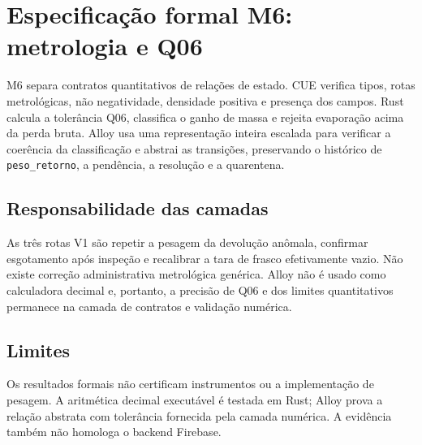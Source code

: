 \clearpage
\section{Especificação formal M6: metrologia e Q06}
\label{sec:formal-m6}

M6 separa contratos quantitativos de relações de estado. CUE verifica tipos,
rotas metrológicas, não negatividade, densidade positiva e presença dos campos.
Rust calcula a tolerância Q06, classifica o ganho de massa e rejeita evaporação
acima da perda bruta. Alloy usa uma representação inteira escalada para verificar
a coerência da classificação e abstrai as transições, preservando o histórico de
\texttt{peso\_retorno}, a pendência, a resolução e a quarentena.

\subsection*{Responsabilidade das camadas}
As três rotas V1 são repetir a pesagem da devolução anômala, confirmar
esgotamento após inspeção e recalibrar a tara de frasco efetivamente vazio.
Não existe correção administrativa metrológica genérica. Alloy não é usado como
calculadora decimal e, portanto, a precisão de Q06 e dos limites quantitativos
permanece na camada de contratos e validação numérica.

\begingroup\small\raggedright


\par\endgroup

\subsection*{Limites}
Os resultados formais não certificam instrumentos ou a implementação de pesagem.
A aritmética decimal executável é testada em Rust; Alloy prova a relação abstrata
com tolerância fornecida pela camada numérica. A evidência também não homologa o
backend Firebase.
